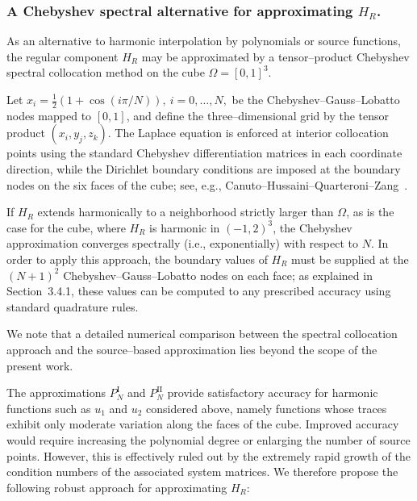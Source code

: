 \documentclass[12pt,oneside,reqno]{amsart}%
\theoremstyle{plain}
\numberwithin{equation}{section}
\begin{document}
\subsubsection{A Chebyshev spectral alternative for approximating $H_R$.}\label{Cheby}\hfill

As an alternative to harmonic interpolation by polynomials or source
functions, the regular component $H_R$ may be approximated by a
tensor–product Chebyshev spectral collocation method on the cube
$\Omega=[0,1]^3$.

Let
$
x_i=\tfrac12\!\left(1+\cos(i\pi/N)\right),
\ i=0,\dots,N,
$
be the Chebyshev–Gauss–Lobatto nodes mapped to $[0,1]$, and define the
three–dimensional grid by the tensor product $(x_i,y_j,z_k)$.
The Laplace equation is enforced at interior collocation points using the
standard Chebyshev differentiation matrices in each coordinate
direction, while the Dirichlet boundary conditions are imposed at the
boundary nodes on the six faces of the cube; see, e.g.,
Canuto–Hussaini–Quarteroni–Zang~\cite{Canuto}.

If $H_R$ extends harmonically to a neighborhood strictly larger than
$\Omega$, as is the case for the cube, where $H_R$ is harmonic in
$(-1,2)^3$, the Chebyshev approximation converges spectrally (i.e.,
exponentially) with respect to $N$. In order to apply this approach,
the boundary values of $H_R$ must be supplied at the $(N+1)^2$
Chebyshev–Gauss–Lobatto nodes on each face; as explained in
Section~3.4.1, these values can be computed to any prescribed accuracy
using standard quadrature rules.

We note that a detailed numerical comparison between the spectral
collocation approach and the source–based approximation lies beyond
the scope of the present work.

\iffalse
The approximations $P_N^{\mathrm{I}}$ and $P_N^{\mathrm{II}}$ 
provide satisfactory accuracy for harmonic functions such as 
$u_1$ and $u_2$ considered above, namely functions whose traces 
exhibit only moderate variation along the faces of the cube. 
Improved accuracy would require increasing the polynomial degree 
or enlarging the number of source points. 
However, this is effectively ruled out by the extremely rapid growth 
of the condition numbers of the associated system matrices. 
We therefore propose the following robust approach 
for approximating $H_R$:
\end{document}
